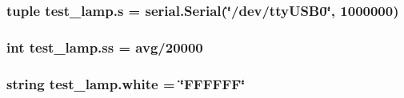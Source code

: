 \subsubsection[{s}]{\setlength{\rightskip}{0pt plus 5cm}tuple test\+\_\+lamp.\+s = serial.\+Serial(\char`\"{}/dev/tty\+U\+S\+B0\char`\"{}, 1000000)}\label{namespacetest__lamp_a2a800f9adfbfa469a4512743d36bd781}
\hypertarget{namespacetest__lamp_ae1d972cb1f7453e75b2d00c0b8dcddaa}{}
\subsubsection[{ss}]{\setlength{\rightskip}{0pt plus 5cm}int test\+\_\+lamp.\+ss = {\bf avg}/20000}\label{namespacetest__lamp_ae1d972cb1f7453e75b2d00c0b8dcddaa}
\hypertarget{namespacetest__lamp_aa06530574bc0e50eb9bf9cb94cb98d95}{}
\subsubsection[{white}]{\setlength{\rightskip}{0pt plus 5cm}string test\+\_\+lamp.\+white = \char`\"{}F\+F\+F\+F\+F\+F\char`\"{}}\label{namespacetest__lamp_aa06530574bc0e50eb9bf9cb94cb98d95}
